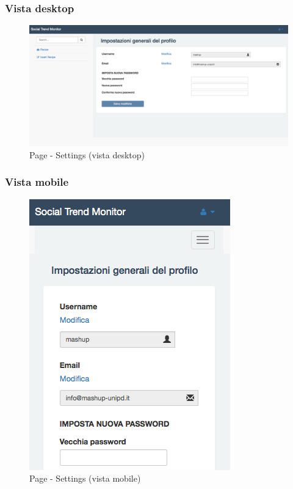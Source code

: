 		\subsubsection{Vista desktop} %
		\begin{figure}[htbp]
			\centering
			\centerline{\includegraphics[scale=0.4]{./images/mockup/settings_vd.pdf}}
			\caption{Page - Settings (vista desktop)}
		\end{figure}

		\subsubsection{Vista mobile} %
		\begin{figure}[htbp]
			\centering
			\centerline{\includegraphics[scale=0.5]{./images/mockup/settings_vm.png}}
			\caption{Page - Settings (vista mobile)}
		\end{figure}		%


